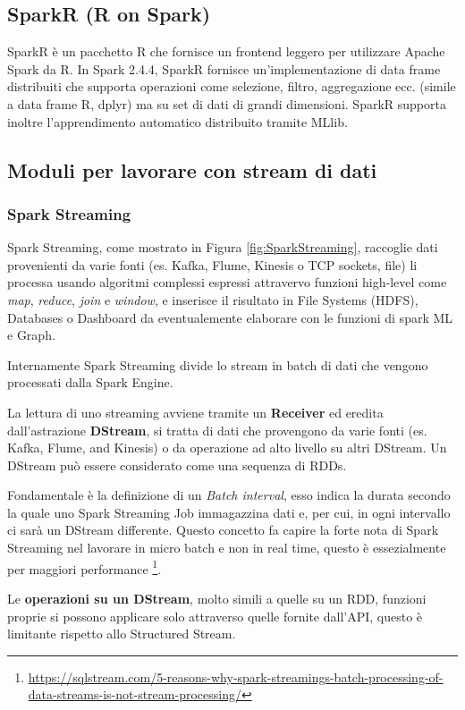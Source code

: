 \documentclass[12pt,italian]{article}
\begin{document}
\subsection{SparkR (R on Spark)}
SparkR è un pacchetto R che fornisce un frontend leggero per utilizzare Apache Spark da R. In Spark 2.4.4, SparkR fornisce un'implementazione di data frame distribuiti che supporta operazioni come selezione, filtro, aggregazione ecc. (simile a data frame R, dplyr) ma su set di dati di grandi dimensioni. SparkR supporta inoltre l'apprendimento automatico distribuito tramite MLlib.

\subsection{Moduli per lavorare con stream di dati}
\subsubsection{Spark Streaming}
Spark Streaming, come mostrato in Figura \ref{fig:SparkStreaming}, raccoglie dati provenienti da varie fonti (es. Kafka, Flume, Kinesis o TCP sockets, file) li processa usando algoritmi complessi espressi attravervo funzioni high-level come \textit{map}, \textit{reduce}, \textit{join} e \textit{window}, e inserisce il risultato in File Systems (HDFS), Databases o Dashboard da eventualemente elaborare con le funzioni di spark ML e Graph.

Internamente Spark Streaming divide lo stream in batch di dati che vengono processati dalla Spark Engine.

La lettura di uno streaming avviene tramite un \textbf{Receiver} ed eredita dall'astrazione \textbf{DStream}, si tratta di dati che provengono da varie fonti (es. Kafka, Flume, and Kinesis) o da operazione ad alto livello su altri DStream.
Un DStream può essere considerato come una sequenza di RDDs.

Fondamentale è la definizione di un \textit{Batch interval}, esso indica la durata secondo la quale uno Spark Streaming Job immagazzina dati e, per cui, in ogni intervallo ci sarà un DStream differente.
Questo concetto fa capire la forte nota di Spark Streaming nel lavorare in micro batch e non in real time, questo è essezialmente per maggiori performance \footnote{\url{https://sqlstream.com/5-reasons-why-spark-streamings-batch-processing-of-data-streams-is-not-stream-processing/}}. %

Le \textbf{operazioni su un DStream}, molto simili a quelle su un RDD, funzioni proprie si possono applicare 
solo attraverso quelle fornite dall'API, questo è limitante rispetto allo Structured Stream.
\end{document}
